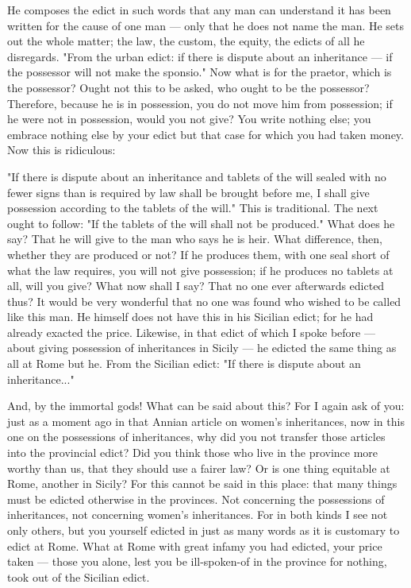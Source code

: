  He composes the edict in such words that any man can understand it has been written for the cause of one man --- only that he does not name the man. He sets out the whole matter; the law, the custom, the equity, the edicts of all he disregards. "From the urban edict: if there is dispute about an inheritance --- if the possessor will not make the sponsio." Now what is for the praetor, which is the possessor? Ought not this to be asked, who ought to be the possessor? Therefore, because he is in possession, you do not move him from possession; if he were not in possession, would you not give? You write nothing else; you embrace nothing else by your edict but that case for which you had taken money. Now this is ridiculous:

 "If there is dispute about an inheritance and tablets of the will sealed with no fewer signs than is required by law shall be brought before me, I shall give possession according to the tablets of the will." This is traditional. The next ought to follow: "If the tablets of the will shall not be produced." What does he say? That he will give to the man who says he is heir. What difference, then, whether they are produced or not? If he produces them, with one seal short of what the law requires, you will not give possession; if he produces no tablets at all, will you give? What now shall I say? That no one ever afterwards edicted thus? It would be very wonderful that no one was found who wished to be called like this man. He himself does not have this in his Sicilian edict; for he had already exacted the price. Likewise, in that edict of which I spoke before --- about giving possession of inheritances in Sicily --- he edicted the same thing as all at Rome but he. From the Sicilian edict: "If there is dispute about an inheritance..."

 And, by the immortal gods! What can be said about this? For I again ask of you: just as a moment ago in that Annian article on women's inheritances, now in this one on the possessions of inheritances, why did you not transfer those articles into the provincial edict? Did you think those who live in the province more worthy than us, that they should use a fairer law? Or is one thing equitable at Rome, another in Sicily? For this cannot be said in this place: that many things must be edicted otherwise in the provinces. Not concerning the possessions of inheritances, not concerning women's inheritances. For in both kinds I see not only others, but you yourself edicted in just as many words as it is customary to edict at Rome. What at Rome with great infamy you had edicted, your price taken --- those you alone, lest you be ill-spoken-of in the province for nothing, took out of the Sicilian edict.

